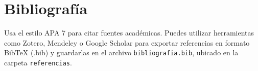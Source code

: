 \newpage

\begingroup
\setlength{\bibitemsep}{8pt}   %
\section*{Bibliografía}
\printbibliography[heading=none]
\endgroup

\vspace{0.5cm}

\begin{tcolorbox}[colback=gray!10, colframe=black!30, title={Sugerencia para esta sección}]
    Usa el estilo APA 7 para citar fuentes académicas. Puedes utilizar herramientas como Zotero, Mendeley o Google Scholar para exportar referencias en formato BibTeX (.bib) y guardarlas en el archivo \texttt{bibliografia.bib}, ubicado en la carpeta \texttt{referencias}.
\end{tcolorbox}

\newpage
